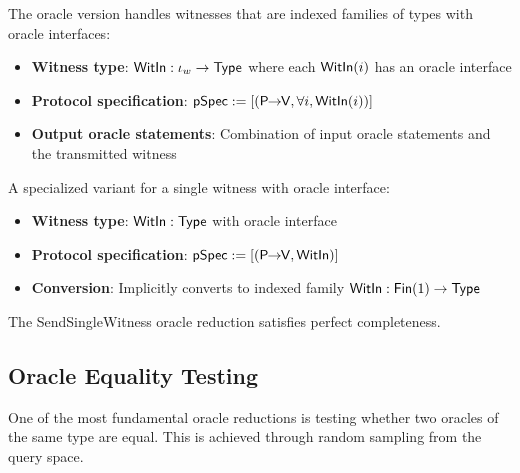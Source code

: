 \begin{definition}
    \label{def:sendwitness_oracle_reduction}
    The oracle version handles witnesses that are indexed families of types with oracle interfaces:
    \begin{itemize}
        \item \textbf{Witness type}: $\mathsf{WitIn} : \iota_w \to \mathsf{Type}$ where each $\mathsf{WitIn}(i)$ has an oracle interface
        \item \textbf{Protocol specification}: $\mathsf{pSpec} := [(\mathsf{P \!\!\rightarrow\!\! V}, \forall i, \mathsf{WitIn}(i))]$
        \item \textbf{Output oracle statements}: Combination of input oracle statements and the transmitted witness
    \end{itemize}
\end{definition}

\begin{definition}
    \label{def:sendsinglewitness_oracle_reduction}
    A specialized variant for a single witness with oracle interface:
    \begin{itemize}
        \item \textbf{Witness type}: $\mathsf{WitIn} : \mathsf{Type}$ with oracle interface
        \item \textbf{Protocol specification}: $\mathsf{pSpec} := [(\mathsf{P \!\!\rightarrow\!\! V}, \mathsf{WitIn})]$
        \item \textbf{Conversion}: Implicitly converts to indexed family $\mathsf{WitIn} : \mathsf{Fin}(1) \to \mathsf{Type}$
    \end{itemize}
\end{definition}

\begin{theorem}
    The SendSingleWitness oracle reduction satisfies perfect completeness.
\end{theorem}

\subsection{Oracle Equality Testing}

One of the most fundamental oracle reductions is testing whether two oracles of the same type are equal. This is achieved through random sampling from the query space.

